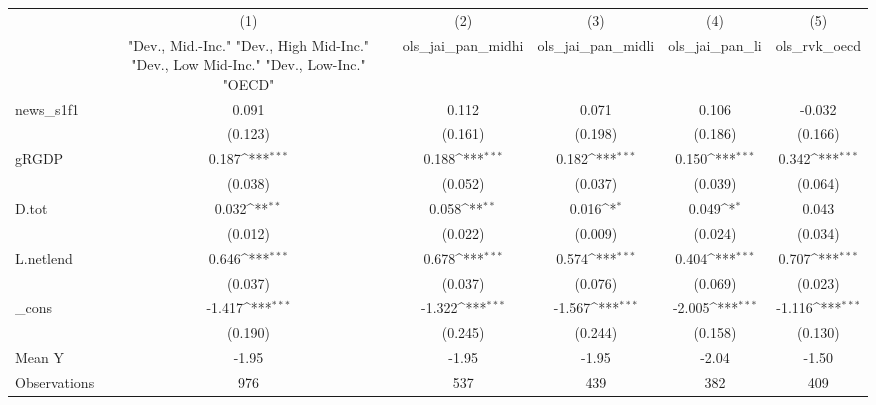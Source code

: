{
\def\sym#1{\ifmmode^{#1}\else\(^{#1}\)\fi}
\begin{tabular}{l*{5}{c}}
\toprule
            &\multicolumn{1}{c}{(1)}&\multicolumn{1}{c}{(2)}&\multicolumn{1}{c}{(3)}&\multicolumn{1}{c}{(4)}&\multicolumn{1}{c}{(5)}\\
            &\multicolumn{1}{c}{ "Dev., Mid.-Inc." "Dev., High Mid-Inc." "Dev., Low Mid-Inc." "Dev., Low-Inc." "OECD" }&\multicolumn{1}{c}{ols\_jai\_pan\_midhi}&\multicolumn{1}{c}{ols\_jai\_pan\_midli}&\multicolumn{1}{c}{ols\_jai\_pan\_li}&\multicolumn{1}{c}{ols\_rvk\_oecd}\\
\midrule
news\_s1f1   &       0.091         &       0.112         &       0.071         &       0.106         &      -0.032         \\
            &     (0.123)         &     (0.161)         &     (0.198)         &     (0.186)         &     (0.166)         \\
\addlinespace
gRGDP       &       0.187\sym{***}&       0.188\sym{***}&       0.182\sym{***}&       0.150\sym{***}&       0.342\sym{***}\\
            &     (0.038)         &     (0.052)         &     (0.037)         &     (0.039)         &     (0.064)         \\
\addlinespace
D.tot       &       0.032\sym{**} &       0.058\sym{**} &       0.016\sym{*}  &       0.049\sym{*}  &       0.043         \\
            &     (0.012)         &     (0.022)         &     (0.009)         &     (0.024)         &     (0.034)         \\
\addlinespace
L.netlend   &       0.646\sym{***}&       0.678\sym{***}&       0.574\sym{***}&       0.404\sym{***}&       0.707\sym{***}\\
            &     (0.037)         &     (0.037)         &     (0.076)         &     (0.069)         &     (0.023)         \\
\addlinespace
\_cons      &      -1.417\sym{***}&      -1.322\sym{***}&      -1.567\sym{***}&      -2.005\sym{***}&      -1.116\sym{***}\\
            &     (0.190)         &     (0.245)         &     (0.244)         &     (0.158)         &     (0.130)         \\
\midrule
Mean Y      &       -1.95         &       -1.95         &       -1.95         &       -2.04         &       -1.50         \\
Observations&         976         &         537         &         439         &         382         &         409         \\
\bottomrule
\end{tabular}
}
